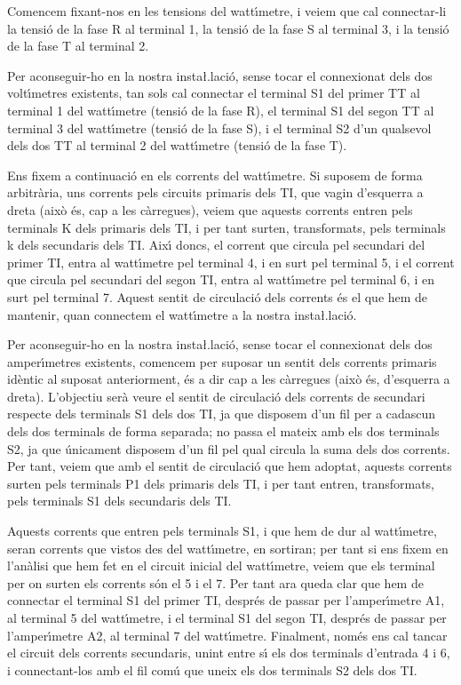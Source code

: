 \begin{exemple}
Comencem fixant-nos en les tensions del watt\'{\i}metre, i veiem que cal
connectar-li la tensi\'{o} de la fase R al terminal 1, la tensi\'{o} de la
fase S al terminal 3, i la tensi\'{o} de la fase T al terminal 2.

Per aconseguir-ho en la nostra insta{\l.l}aci\'{o}, sense tocar el
connexionat dels dos volt\'{\i}metres existents, tan sols cal connectar
el terminal S1 del primer TT al terminal 1 del watt\'{\i}metre (tensi\'{o} de
la fase R), el terminal S1 del segon TT al terminal 3 del watt\'{\i}metre
(tensi\'{o} de la fase S), i el terminal S2 d'un qualsevol dels dos TT
al terminal 2 del watt\'{\i}metre (tensi\'{o} de la fase T).

Ens fixem a continuaci\'{o} en els corrents del watt\'{\i}metre. Si suposem
de forma arbitr\`{a}ria, uns corrents pels circuits primaris dels TI,
que vagin d'esquerra a dreta (aix\`{o} \'{e}s, cap a les c\`{a}rregues), veiem
que aquests corrents entren pels terminals K dels primaris dels TI,
i per tant surten, transformats, pels terminals k dels secundaris
dels TI. Aix\'{\i} doncs, el corrent que circula pel secundari del primer
TI, entra al watt\'{\i}metre pel terminal 4, i en surt pel terminal 5, i
el corrent que circula pel secundari del segon TI, entra al
watt\'{\i}metre pel terminal 6, i en surt pel terminal 7. Aquest sentit
de circulaci\'{o} dels corrents \'{e}s el que hem de mantenir, quan
connectem el watt\'{\i}metre a la nostra insta{\l.l}aci\'{o}.

Per aconseguir-ho en la nostra insta{\l.l}aci\'{o}, sense tocar el
connexionat dels dos amper\'{\i}metres existents, comencem per suposar un
sentit dels corrents primaris id\`{e}ntic al suposat anteriorment, \'{e}s a
dir cap a les c\`{a}rregues (aix\`{o} \'{e}s, d'esquerra a dreta). L'objectiu
ser\`{a} veure el sentit de circulaci\'{o} dels corrents de secundari
respecte dels terminals S1 dels dos TI, ja que disposem d'un fil per
a cadascun dels dos terminals de forma separada; no passa el mateix
amb els dos terminals S2, ja que \'{u}nicament disposem d'un fil pel
qual circula la suma dels dos corrents. Per tant, veiem que amb el
sentit de circulaci\'{o} que hem adoptat, aquests corrents surten pels
terminals P1 dels primaris dels TI, i per tant entren, transformats,
pels terminals S1 dels secundaris dels TI.

Aquests corrents que entren pels terminals S1, i que hem de dur al
watt\'{\i}metre, seran corrents que vistos des del watt\'{\i}metre, en
sortiran; per tant si ens fixem en l'an\`{a}lisi que hem fet en el
circuit inicial del watt\'{\i}metre, veiem que els terminal per on surten
els corrents s\'{o}n el 5 i el 7. Per tant ara queda clar que hem de
connectar el terminal S1 del primer TI, despr\'{e}s de passar per
l'amper\'{\i}metre \textsf{A1}, al terminal 5 del watt\'{\i}metre, i el
terminal S1 del segon TI, despr\'{e}s de passar per l'amper\'{\i}metre
\textsf{A2}, al terminal 7 del watt\'{\i}metre. Finalment, nom\'{e}s ens cal
tancar el circuit dels corrents secundaris, unint entre s\'{\i} els dos
terminals d'entrada 4  i 6, i connectant-los amb el fil com\'{u} que
uneix els dos terminals S2 dels dos TI.


\end{exemple}
